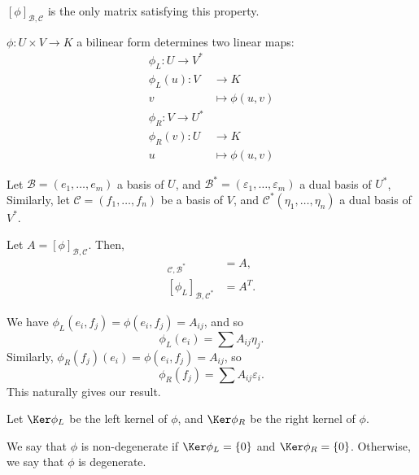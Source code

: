 \documentclass[12pt]{article}
\begin{document}
\begin{remark}
	$[\phi]_{\mathcal{B},\mathcal{C}}$ is the only matrix satisfying this property.
\end{remark}

\begin{definition}
	$\phi: U \times V \to K$ a bilinear form determines two linear maps:
	\begin{align*}
		\phi_L : U \to V^{\ast}& \\
		\phi_L(u) : V &\to K \\
			      v &\mapsto \phi(u, v)\\
			      \phi_R : V \to U^{\ast}& \\
			      \phi_R(v) : U &\to K \\
			      u &\mapsto \phi(u, v)
	\end{align*}
\end{definition}

\begin{lemma}
	Let $\mathcal{B} = (e_1, \ldots, e_m)$ a basis of $U$, and $\mathcal{B}^{\ast} = (\varepsilon_1, \ldots, \varepsilon_m)$ a dual basis of $U^{\ast}$, Similarly, let $\mathcal{C} = (f_1, \ldots, f_n)$ be a basis of $V$, and $\mathcal{C}^{\ast} (\eta_1, \ldots, \eta_n)$ a dual basis of $V^{\ast}$.

	Let $A = [\phi]_{\mathcal{B}, \mathcal{C}}$. Then,
	\begin{align*}
		[\phi_R]_{\mathcal{C}, \mathcal{B}^{\ast}} &= A, \\
		[\phi_L]_{\mathcal{B}, \mathcal{C}^{\ast}} &= A^{T}.
	\end{align*}
\end{lemma}

\begin{proofbox}
	We have $\phi_L(e_i, f_j) = \phi(e_i, f_j) = A_{ij}$, and so
	\[
		\phi_L(e_i) = \sum A_{ij} \eta_j
	.\]
	Similarly, $\phi_R(f_j)(e_i) = \phi(e_i, f_j) = A_{ij}$, so
	\[
		\phi_R(f_{j}) = \sum A_{ij} \varepsilon_i
	.\]
	This naturally gives our result.
\end{proofbox}

\begin{definition}
	Let $\Ker \phi_L$ be the left kernel of $\phi$, and $\Ker \phi_R$ be the right kernel of $\phi$.

	We say that $\phi$ is non-degenerate if $\Ker \phi_L = \{0\}$ and $\Ker \phi_R = \{0\}$. Otherwise, we say that $\phi$ is degenerate.
\end{definition}
\end{document}
